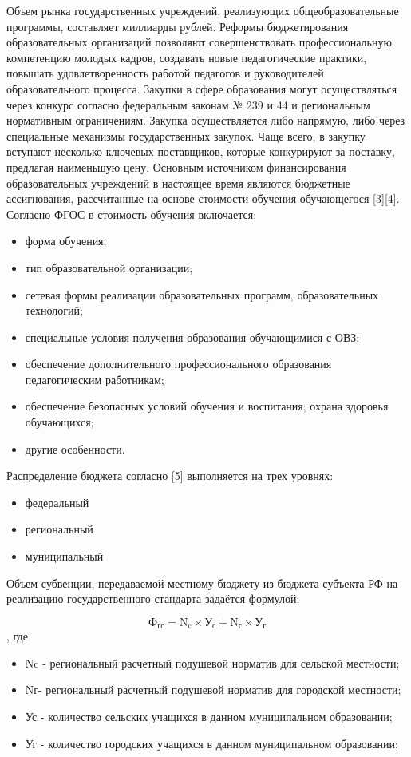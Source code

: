 Объем рынка государственных учреждений, реализующих общеобразовательные программы, составляет миллиарды рублей. Реформы бюджетирования образовательных организаций позволяют совершенствовать профессиональную компетенцию молодых кадров, создавать новые педагогические практики, повышать удовлетворенность работой педагогов и руководителей образовательного процесса.  
Закупки в сфере образования могут осуществляться через конкурс согласно федеральным законам № 239 и 44 и региональным нормативным ограничениям. Закупка осуществляется либо напрямую, либо через специальные механизмы государственных закупок. Чаще всего, в закупку вступают несколько ключевых поставщиков, которые конкурируют за поставку, предлагая наименьшую цену. 
Основным источником финансирования образовательных учреждений в настоящее время являются бюджетные ассигнования, рассчитанные на основе стоимости обучения обучающегося [3][4]. Согласно ФГОС в стоимость обучения включается:
\begin{itemize}
    \item форма обучения;
    \item тип образовательной организации;
    \item сетевая формы реализации образовательных программ, образовательных технологий;
    \item специальные условия получения образования обучающимися с ОВЗ;
    \item  обеспечение дополнительного профессионального образования педагогическим работникам;
    \item обеспечение безопасных условий обучения и воспитания;
охрана здоровья обучающихся;
    \item другие особенности.
\end{itemize}

Распределение бюджета согласно [5] выполняется на трех уровнях:

\begin{itemize}
    \item федеральный
    \item региональный 
    \item муниципальный
\end{itemize}

Объем субвенции, передаваемой местному бюджету из бюджета субъекта РФ на реализацию государственного стандарта задаётся формулой:

$$
    \text{Ф}_\text{гс} = \text{N}_\text{c} \times \text{У}_\text{с} + \text{N}_\text{г} \times \text{У}_\text{г}
$$
, где
\begin{itemize}
    \item Nc - региональный расчетный подушевой норматив для сельской местности;
    \item Nг- региональный расчетный подушевой норматив для городской местности;
    \item Ус - количество сельских учащихся в данном муниципальном образовании;
    \item Уг - количество городских учащихся в данном муниципальном образовании;
\end{itemize}
             
